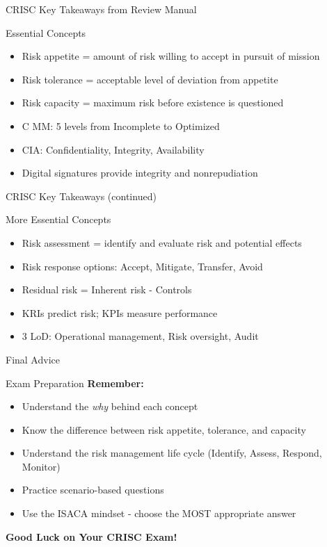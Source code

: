 \documentclass{beamer}
\begin{document}
	\begin{frame}{CRISC Key Takeaways from Review Manual}
		\begin{block}{Essential Concepts}
			\begin{itemize}
				\item Risk appetite = amount of risk willing to accept in pursuit of mission
				\item Risk tolerance = acceptable level of deviation from appetite
				\item Risk capacity = maximum risk before existence is questioned
				\item C MM: 5 levels from Incomplete to Optimized
				\item CIA: Confidentiality, Integrity, Availability
				\item Digital signatures provide integrity and nonrepudiation
			\end{itemize}
		\end{block}
	\end{frame}
	
	\begin{frame}{CRISC Key Takeaways (continued)}
		\begin{block}{More Essential Concepts}
			\begin{itemize}
				\item Risk assessment = identify and evaluate risk and potential effects
				\item Risk response options: Accept, Mitigate, Transfer, Avoid
				\item Residual risk = Inherent risk - Controls
				\item KRIs predict risk; KPIs measure performance
				\item 3 LoD: Operational management, Risk oversight, Audit
			\end{itemize}
		\end{block}
	\end{frame}
	
	\begin{frame}{Final Advice}
		\begin{block}{Exam Preparation}
			\centering
			\vspace{0.3cm}
			\textbf{Remember:}
			\begin{itemize}
				\item Understand the \textit{why} behind each concept
				\item Know the difference between risk appetite, tolerance, and capacity
				\item Understand the risk management life cycle (Identify, Assess, Respond, Monitor)
				\item Practice scenario-based questions
				\item Use the ISACA mindset - choose the MOST appropriate answer
			\end{itemize}
			\vspace{0.5cm}
			\textbf{Good Luck on Your CRISC Exam!}
		\end{block}
	\end{frame}
	
\end{document}
